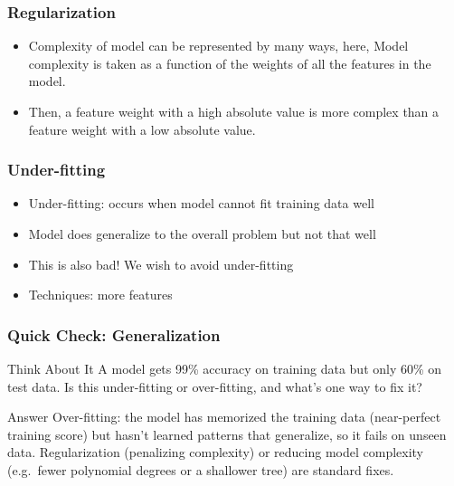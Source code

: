 \begin{frame}[fragile]\frametitle{Regularization}


	\begin{itemize}
	\item Complexity of model can be represented by many ways, here, Model complexity is taken as a function of the weights of all the features in the model.
	\item Then, a feature weight with a high absolute value is more complex than a feature weight with a low absolute value.
	\end{itemize}
	
\end{frame}



\begin{frame}[fragile]\frametitle{Under-fitting}
\begin{itemize}
\item Under-fitting: occurs when model cannot fit training data well
\item Model does generalize to the overall problem but not that well
\item This is also bad! We wish to avoid under-fitting
\item Techniques: more features
\end{itemize}
\end{frame}

\begin{frame}[fragile]\frametitle{Quick Check: Generalization}
\begin{block}{Think About It}
A model gets 99\% accuracy on training data but only 60\% on test data. Is this under-fitting or over-fitting, and what's one way to fix it?
\end{block}
\pause
\begin{block}{Answer}
Over-fitting: the model has memorized the training data (near-perfect training score) but hasn't learned patterns that generalize, so it fails on unseen data. Regularization (penalizing complexity) or reducing model complexity (e.g.\ fewer polynomial degrees or a shallower tree) are standard fixes.
\end{block}
\end{frame}

